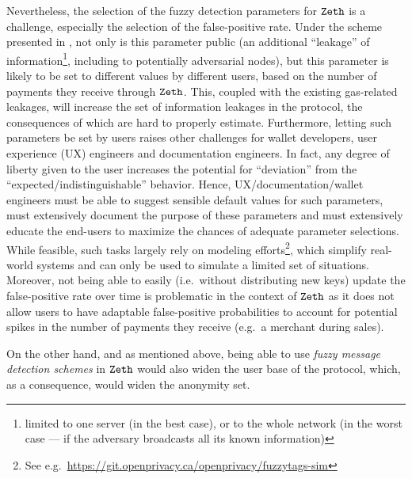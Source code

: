 Nevertheless, the selection of the fuzzy detection parameters for $\texttt{Zeth}$ is a challenge, especially the selection of the false-positive rate.
Under the scheme presented in \cite{DBLP:journals/iacr/BeckLMG21}, not only is this parameter public (an additional ``leakage'' of information\footnote{limited to one server (in the best case), or to the whole network (in the worst case --- if the adversary broadcasts all its known information)}, including to potentially adversarial nodes), but this parameter is likely to be set to different values by different users, based on the number of payments they receive through $\texttt{Zeth}$.  This, coupled with the existing gas-related leakages, will increase the set of information leakages in the protocol, the consequences of which are hard to properly estimate. Furthermore, letting such parameters be set by users raises other challenges for wallet developers, user experience (UX) engineers and documentation engineers. In fact, any degree of liberty given to the user increases the potential for ``deviation'' from the ``expected/indistinguishable'' behavior. Hence, UX/documentation/wallet engineers must be able to suggest sensible default values for such parameters, must extensively document the purpose of these parameters and must extensively educate the end-users to maximize the chances of adequate parameter selections. While feasible, such tasks largely rely on modeling efforts\footnote{See e.g.~\url{https://git.openprivacy.ca/openprivacy/fuzzytags-sim}}, which simplify real-world systems and can only be used to simulate a limited set of situations.
Moreover, not being able to easily (i.e.~without distributing new keys) update the false-positive rate over time is problematic in the context of $\texttt{Zeth}$ as it does not allow users to have adaptable false-positive probabilities to account for potential spikes in the number of payments they receive (e.g.~a merchant during sales).

On the other hand, and as mentioned above, being able to use \emph{fuzzy message detection schemes} in $\texttt{Zeth}$ would also widen the user base of the protocol, which, as a consequence, would widen the anonymity set.
